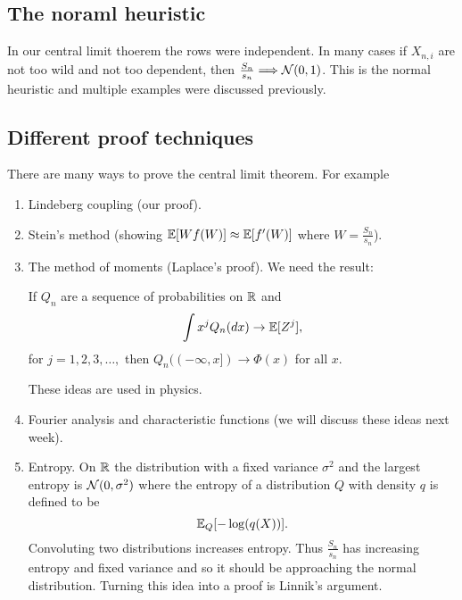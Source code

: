 \subsection{The noraml heuristic}
In our central limit thoerem the rows were independent. In many cases if $X_{n,i}$ are not too wild and not too dependent, then $\frac{S_n}{s_n} \Longrightarrow {{\mathcal{N}}}(0,1)$. This is the normal heuristic and multiple examples were discussed previously.
\subsection{Different proof techniques}
There are many ways to prove the central limit theorem. For example
\begin{enumerate}
    \item Lindeberg coupling (our proof).
    \item Stein's method (showing ${\mathbb{E}}[Wf(W)]\approx  {\mathbb{E}}[f'(W)]$ where $W = \frac{S_n}{s_n}$).
    \item The method of moments (Laplace's proof). We need the result:
    \begin{thrm}
        If $Q_n$ are a sequence of probabilities on ${\mathbb R}$ and 
        \[ \int x^j Q_n(dx) \to  {\mathbb{E}}[Z^j],\]
        for $j=1,2,3,\ldots,$ then $Q_n((-\infty,x])\to \Phi(x)$ for all $x$.
    \end{thrm}
    These ideas are used in physics.
\item Fourier analysis and characteristic functions (we will discuss these ideas next week).
\item Entropy. On ${\mathbb R}$ the distribution with a fixed variance $\sigma^2$ and the largest entropy is ${{\mathcal{N}}}(0,\sigma^2)$ where the entropy of a distribution $Q$ with density $q$ is defined to be
\[{\mathbb{E}}_Q[-\log(q(X))].\]
Convoluting two distributions increases entropy. Thus $\frac{S_n}{s_n}$ has increasing entropy and fixed variance and so it should be approaching the normal distribution. Turning this idea into a proof is Linnik's argument.
\end{enumerate}
